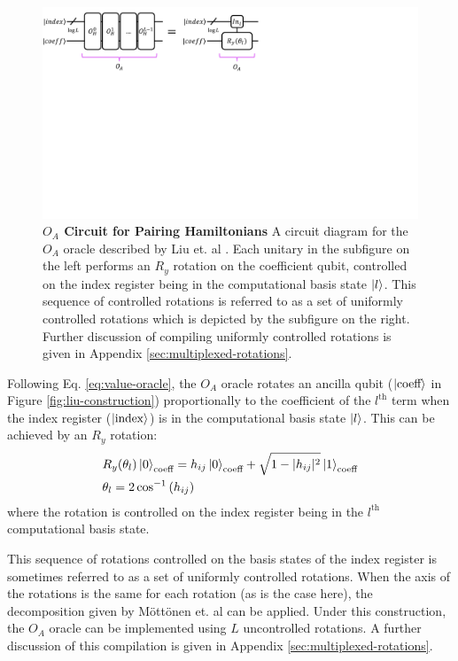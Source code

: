 \begin{figure}[h]
    \includegraphics[width=12cm]{figures/liu-O_A.pdf}
    \caption{
        \textbf{$O_A$ Circuit for Pairing Hamiltonians}
        A circuit diagram for the $O_A$ oracle described by Liu et. al \cite{liu2024efficient}.
        Each unitary in the subfigure on the left performs an $R_y$ rotation on the coefficient qubit, controlled on the index register being in the computational basis state $\ket{l}$.
        This sequence of controlled rotations is referred to as a set of uniformly controlled rotations which is depicted by the subfigure on the right.
        Further discussion of compiling uniformly controlled rotations is given in Appendix \ref{sec:multiplexed-rotations}.
    }
    \label{fig:liu-O_A}
\end{figure}

Following Eq. \ref{eq:value-oracle}, the $O_A$ oracle rotates an ancilla qubit ($\ket{\text{coeff}}$ in Figure \ref{fig:liu-construction}) proportionally to the coefficient of the $l^\text{th}$ term when the index register ($\ket{\text{index}}$) is in the computational basis state $\ket{l}$.
This can be achieved by an $R_y$ rotation:
\begin{equation}
    \begin{split}
        & R_y (\theta_l) \ket{0}_\text{coeff} = h_{ij} \ket{0}_\text{coeff} + \sqrt{1 - |h_{ij}|^2} \ket{1}_\text{coeff} \\
        & \theta_l = 2 \cos^{-1}{(h_{ij})}
    \end{split}
\end{equation}
where the rotation is controlled on the index register being in the $l^\text{th}$ computational basis state.

This sequence of rotations controlled on the basis states of the index register is sometimes referred to as a set of uniformly controlled rotations.
When the axis of the rotations is the same for each rotation (as is the case here), the decomposition given by Möttönen et. al \cite{mottonen2004transformation} can be applied.
Under this construction, the $O_A$ oracle can be implemented using $L$ uncontrolled rotations.
A further discussion of this compilation is given in Appendix \ref{sec:multiplexed-rotations}.

